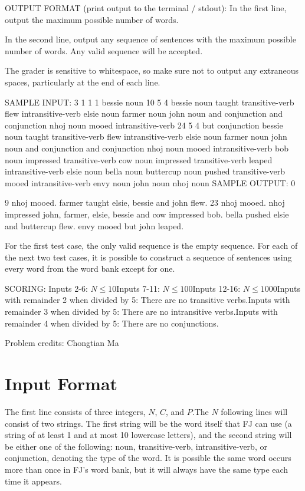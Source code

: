 \documentclass[12pt]{article}
\begin{document}
OUTPUT FORMAT (print output to the terminal / stdout):
In the first line, output the maximum possible number of words.

In the second line, output any sequence of sentences with the maximum possible
number of words. Any valid sequence will be accepted.

The grader is sensitive to whitespace, so make sure not to output any
extraneous spaces, particularly at the end of each line.

SAMPLE INPUT:
3
1 1 1
bessie noun
10 5 4
bessie noun
taught transitive-verb
flew intransitive-verb
elsie noun
farmer noun
john noun
and conjunction
and conjunction
nhoj noun
mooed intransitive-verb
24 5 4
but conjunction
bessie noun
taught transitive-verb
flew intransitive-verb
elsie noun
farmer noun
john noun
and conjunction
and conjunction
nhoj noun
mooed intransitive-verb
bob noun
impressed transitive-verb
cow noun
impressed transitive-verb
leaped intransitive-verb
elsie noun
bella noun
buttercup noun
pushed transitive-verb
mooed intransitive-verb
envy noun
john noun
nhoj noun
SAMPLE OUTPUT: 
0

9
nhoj mooed. farmer taught elsie, bessie and john flew.
23
nhoj mooed. nhoj impressed john, farmer, elsie, bessie and cow impressed bob. bella pushed elsie and buttercup flew. envy mooed but john leaped.

For the first test case, the only valid sequence is the empty sequence. For each
of the next two test cases, it is possible to construct a sequence of sentences
using every word from the word bank except for one.

SCORING:
Inputs 2-6: $N\le 10$Inputs 7-11: $N\le 100$Inputs 12-16: $N\le 1000$Inputs with remainder 2 when divided by 5: There are no transitive
verbs.Inputs with remainder 3 when divided by 5: There are no intransitive
verbs.Inputs with remainder 4 when divided by 5: There are no conjunctions.


Problem credits: Chongtian Ma



\section*{Input Format}
The first line consists of three integers, $N$, $C$, and $P$.The $N$ following lines will consist of two strings. The first string will be
the word itself that FJ can use (a string of at least 1 and at most 10 lowercase
letters), and the second string will be either one of the following: noun,
transitive-verb, intransitive-verb, or conjunction, denoting the type of the
word. It is possible the same word occurs more than once in FJ's word bank, but
it will always have the same type each time it appears.
\end{document}
